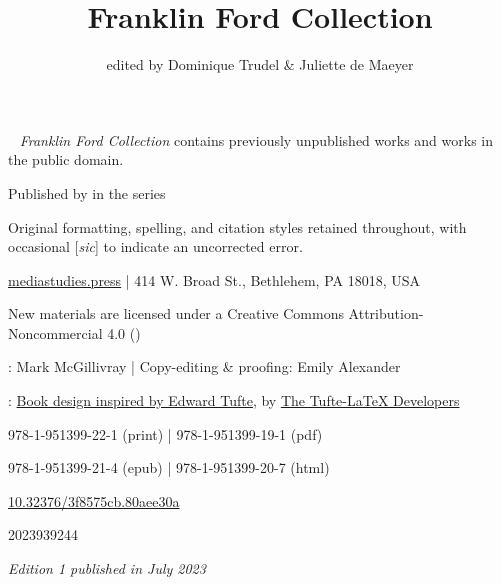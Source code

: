 \documentclass[openany,nobib]{tufte-book}
\title[Franklin Ford Collection]{Franklin Ford Collection}
\date{}
\author[edited by Dominique Trudel \& Juliette de Maeyer]{edited by Dominique Trudel \& Juliette de Maeyer}
\begin{document}
\frontmatter{}\setcounter{page}{1}

\begin{fullwidth}


\maketitle

\end{fullwidth}

\newpage

\begin{fullwidth}

~\vfill
\thispagestyle{empty}
\setlength{\parindent}{0pt}
\setlength{\parskip}{\baselineskip}
\emph{Franklin Ford Collection} contains previously unpublished works and works in the public domain.

\par Published by  in the  series

\par Original formatting, spelling, and citation styles retained throughout, with occasional {[}\emph{sic}{]} to indicate an uncorrected error.

\href{http://mediastudies.press}{mediastudies.press} | 414 W. Broad St., Bethlehem, PA 18018, USA

\par New materials are licensed under a Creative Commons Attribution-Noncommercial 4.0 (\href{https://creativecommons.org/licenses/by-nc/4.0/legalcode}{})

\par {}: Mark McGillivray | Copy-editing \& proofing: Emily Alexander

\par {}: \href{https://www.overleaf.com/latex/templates/book-design-inspired-by-edward-tufte/gcfbtdjfqdjh}{Book design inspired by Edward Tufte}, by \href{https://ctan.org/pkg/tufte-latex}{The Tufte-LaTeX Developers}

\par {} 978-1-951399-22-1 (print) |  978-1-951399-19-1 (pdf)

\par {} 978-1-951399-21-4 (epub) |  978-1-951399-20-7 (html)

\par {} \href{https://doi.org/10.32376/3f8575cb.80aee30a}{10.32376/3f8575cb.80aee30a}

\par {} 2023939244

\par\textit{Edition 1 published in July 2023}

\end{fullwidth}
\end{document}
